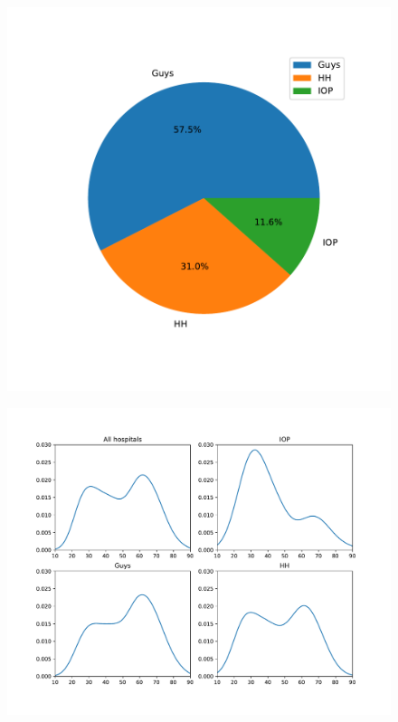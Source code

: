 \begin{figure}
\centering
\begin{minipage}{.5\textwidth}
  \centering
  \includegraphics[width=1\linewidth]{figures/dataset/IXI_hospital_count.pdf}
  \label{fig:IXI_hospital_count}
\end{minipage}%
\begin{minipage}{.5\textwidth}
  \centering
  \includegraphics[width=1\linewidth]{figures/dataset/IXI_age_dist_per_hospital.pdf}
  \label{fig:IXI_age_dist_per_hosp}
\end{minipage}
\end{figure}


